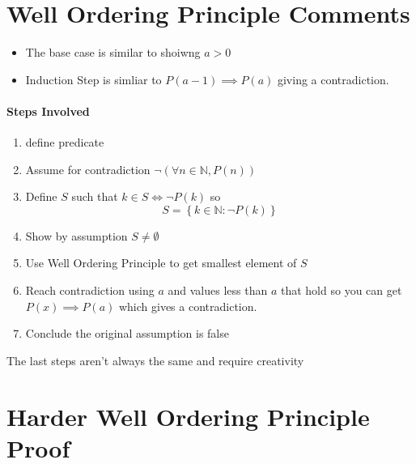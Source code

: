 \documentclass[11pt]{book}
\begin{document}

\section{Well Ordering Principle Comments}%
\label{sec:well_ordering_principle_comments}

\begin{itemize}
    \item The base case is similar to shoiwng $a > 0$
    \item Induction Step is simliar to $P\left(a - 1\right) \implies P\left(a\right) $ giving a contradiction.
\end{itemize}

\paragraph{Steps Involved} 
\begin{enumerate}
    \item define predicate 
    \item Assume for contradiction $\neg \left( \forall n \in \mathbb{N} , P\left(n\right)  \right) $ 
    \item Define $S$ such that $k \in S \Leftrightarrow \neg P\left(k\right) $ so 
        \[
            S = \left\{ k \in \mathbb{N} : \neg P\left(k\right)  \right\} 
        \]
    \item Show by assumption $S \neq \emptyset $ 
    \item Use Well Ordering Principle to get smallest element of $S$  
    \item Reach contradiction using $a$  and values less than $a$ that hold so you can get $P\left(x\right) \implies P\left(a\right) $ which gives a contradiction.
    \item Conclude the original assumption is false 
\end{enumerate}

\begin{note}
    The last steps aren't always the same and require creativity
\end{note}


\newpage

\section{Harder Well Ordering Principle Proof}%
\label{sec:harder_well_ordering_principle_proof}
\end{document}
